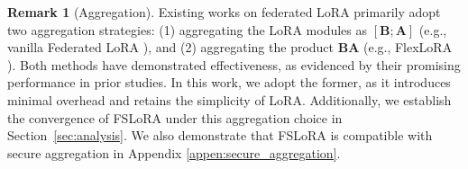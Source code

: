 \documentclass{article} %
\theoremstyle{plain}
\theoremstyle{definition}
\newtheorem{remark}[theorem]{Remark}
\begin{document}
\begin{remark}[Aggregation]
Existing works on federated LoRA primarily adopt two aggregation strategies: (1) aggregating the LoRA modules as $[\mathbf{B}; \mathbf{A}]$ (e.g., vanilla Federated LoRA \cite{zhang2024towards}), and (2) aggregating the product $\mathbf{B} \mathbf{A}$ (e.g., FlexLoRA \cite{bai2024federatedfinetuninglargelanguage}). Both methods have demonstrated effectiveness, as evidenced by their promising performance in prior studies.  In this work, we adopt the former, as it introduces minimal overhead and retains the simplicity of LoRA. Additionally, we establish the convergence of FSLoRA under this aggregation choice in Section~\ref{sec:analysis}. We also demonstrate that FSLoRA is compatible with secure aggregation in Appendix \ref{appen:secure_aggregation}.

\end{remark}
\end{document}
